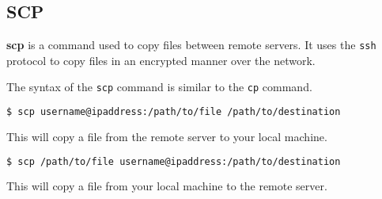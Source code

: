 \subsection{SCP}

\textbf{scp} is a command used to copy files between
remote servers.
It uses the \lstinline|ssh| protocol to copy files
in an encrypted manner over the network.

The syntax of the \lstinline|scp| command is similar
to the \lstinline|cp| command.

\begin{lstlisting}[language=bash]
$ scp username@ipaddress:/path/to/file /path/to/destination
\end{lstlisting}

This will copy a file from the remote server to your
local machine.

\begin{lstlisting}[language=bash]
$ scp /path/to/file username@ipaddress:/path/to/destination
\end{lstlisting}

This will copy a file from your local machine to the
remote server.
